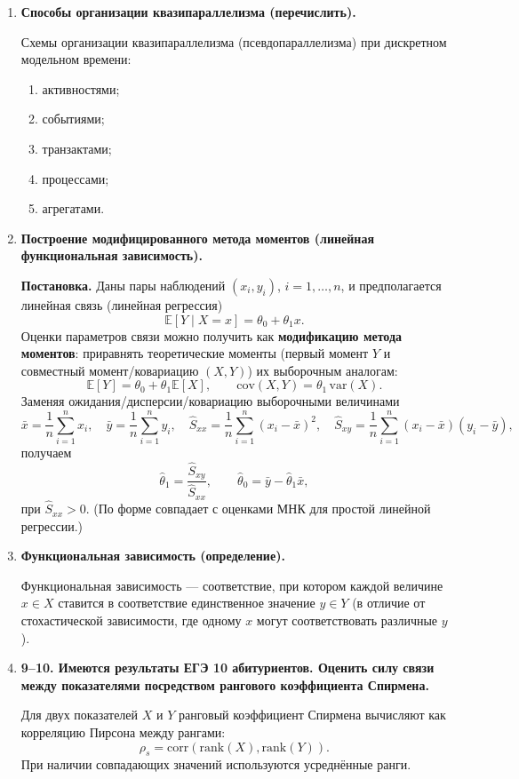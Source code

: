 \documentclass[12pt,a4paper]{article}
\begin{document}
\begin{enumerate}[label=\textbf{\arabic*.}]
\item \textbf{Способы организации квазипараллелизма (перечислить).}

Схемы организации квазипараллелизма (псевдопараллелизма) при дискретном модельном времени:
\begin{enumerate}[label=\arabic*)]
\item активностями;
\item событиями;
\item транзактами;
\item процессами;
\item агрегатами.
\end{enumerate}

\item \textbf{Построение модифицированного метода моментов (линейная функциональная зависимость).}

\textbf{Постановка.} Даны пары наблюдений $(x_i,y_i)$, $i=1,\dots,n$, и предполагается линейная связь (линейная регрессия)
\[
\mathbb{E}[Y\mid X=x]=\theta_0+\theta_1 x.
\]
Оценки параметров связи можно получить как \textbf{модификацию метода моментов}: приравнять теоретические моменты (первый момент $Y$ и совместный момент/ковариацию $(X,Y)$) их выборочным аналогам:
\[
\mathbb{E}[Y]=\theta_0+\theta_1\mathbb{E}[X], \qquad \mathrm{cov}(X,Y)=\theta_1\,\mathrm{var}(X).
\]
Заменяя ожидания/дисперсии/ковариацию выборочными величинами
\[
\bar x=\frac1n\sum_{i=1}^n x_i,\quad \bar y=\frac1n\sum_{i=1}^n y_i,\quad
\widehat S_{xx}=\frac1n\sum_{i=1}^n (x_i-\bar x)^2,\quad
\widehat S_{xy}=\frac1n\sum_{i=1}^n (x_i-\bar x)(y_i-\bar y),
\]
получаем
\[
\hat\theta_1=\frac{\widehat S_{xy}}{\widehat S_{xx}}, \qquad
\hat\theta_0=\bar y-\hat\theta_1\bar x,
\]
при $\widehat S_{xx}>0$. (По форме совпадает с оценками МНК для простой линейной регрессии.)

\item \textbf{Функциональная зависимость (определение).}

Функциональная зависимость — соответствие, при котором каждой величине $x\in X$ ставится в соответствие единственное значение $y\in Y$ (в отличие от стохастической зависимости, где одному $x$ могут соответствовать различные $y$).

\item \textbf{9–10. Имеются результаты ЕГЭ 10 абитуриентов. Оценить силу связи между показателями посредством рангового коэффициента Спирмена.}

Для двух показателей $X$ и $Y$ ранговый коэффициент Спирмена вычисляют как корреляцию Пирсона между рангами:
\[
\rho_s=\mathrm{corr}(\mathrm{rank}(X),\mathrm{rank}(Y)).
\]
При наличии совпадающих значений используются усреднённые ранги.


\end{enumerate}
\end{document}
